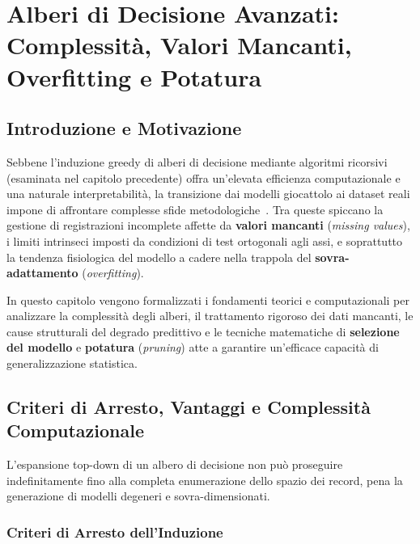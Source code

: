 \chapter[Alberi di Decisione Avanzati: Complessit\`a e Potatura]{Alberi di Decisione Avanzati: Complessit\`a, Valori Mancanti, Overfitting e Potatura}
\label{ch:dm-decision-trees-advanced}

\section{Introduzione e Motivazione}
\label{sec:dm-trees-adv-intro}

Sebbene l'induzione greedy di alberi di decisione mediante algoritmi ricorsivi (esaminata nel capitolo precedente) offra un'elevata efficienza computazionale e una naturale interpretabilità, la transizione dai modelli giocattolo ai dataset reali impone di affrontare complesse sfide metodologiche~\cite{tan2018}. Tra queste spiccano la gestione di registrazioni incomplete affette da \textbf{valori mancanti} (\textit{missing values}), i limiti intrinseci imposti da condizioni di test ortogonali agli assi, e soprattutto la tendenza fisiologica del modello a cadere nella trappola del \textbf{sovra-adattamento} (\textit{overfitting}).

In questo capitolo vengono formalizzati i fondamenti teorici e computazionali per analizzare la complessità degli alberi, il trattamento rigoroso dei dati mancanti, le cause strutturali del degrado predittivo e le tecniche matematiche di \textbf{selezione del modello} e \textbf{potatura} (\textit{pruning}) atte a garantire un'efficace capacità di generalizzazione statistica.

\FloatBarrier
\section{Criteri di Arresto, Vantaggi e Complessit\`a Computazionale}
\label{sec:dm-tree-complexity-algorithms}

L'espansione top-down di un albero di decisione non può proseguire indefinitamente fino alla completa enumerazione dello spazio dei record, pena la generazione di modelli degeneri e sovra-dimensionati.

\FloatBarrier
\subsection{Criteri di Arresto dell'Induzione}
\label{subsec:dm-stopping-criteria}

